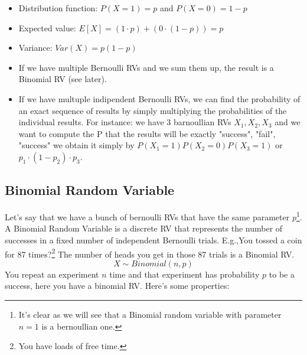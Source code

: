 \documentclass[a4paper]{article}
\begin{document}
\begin{itemize}
    \item Distribution function: \( P(X = 1) = p \) and \( P(X = 0) = 1 - p \)
    \item Expected value: \( E[X] =  (1 \cdot p) + (0 \cdot (1 - p)) = p \) 
    \item Variance: \( Var(X) = p(1 - p) \)
    \item If we have multiple Bernoulli RVs and we sum them up, the result is a Binomial RV (see later).
    \item If we have multuple indipendent Bernoulli RVs, we can find the probability of an exact sequence of results by simply multiplying the probabilities of the individual results. For instance: we have 3 barnoullian RVs $X_1, X_2, X_3$ and we want to compute the P that the results will be exactly "success", "fail", "success" we obtain it simply by $P(X_1 = 1)P(X_2 = 0)P(X_3 = 1)$ or $p_1 \cdot (1-p_2) \cdot p_3$.
\end{itemize}

\subsection{Binomial Random Variable}
Let's say that we have a bunch of bernoulli RVs that have the same parameter $p$\footnote{It's clear as we will see that a Binomial random variable with parameter $n = 1$ is a bernoullian one.}.
A Binomial Random Variable is a discrete RV that represents the number of successes in a fixed number of independent Bernoulli trials.
E.g.,You tossed a coin for 87 times?\footnote{You have loads of free time.} The number of heads you get in those 87 trials is a Binomial RV.
$$X \sim Binomial(n, p)$$
You repeat an experiment $n$ time and that experiment has probability $p$ to be a success, here you have a binomial RV. Here's some properties:
\end{document}
